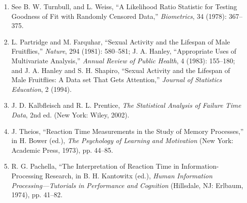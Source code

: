 \documentclass[
]{report}
\begin{document}
\begin{enumerate}
\item See B. W. Turnbull, and L. Weiss, “A Likelihood Ratio Statistic for Testing Goodness of Fit with Randomly Censored Data,” \textit{Biometrics}, 34 (1978): 367–375.
\item L. Partridge and M. Farquhar, “Sexual Activity and the Lifespan of Male Fruitflies,” \textit{Nature}, 294 (1981): 580–581; J. A. Hanley, “Appropriate Uses of Multivariate Analysis,” \textit{Annual Review of Public Health}, 4 (1983): 155–180; and J. A. Hanley and S. H. Shapiro, “Sexual Activity and the Lifespan of Male Fruitflies: A Data set That Gets Attention,” \textit{Journal of Statistics Education}, 2 (1994).
\item J. D. Kalbfleisch and R. L. Prentice, \textit{The Statistical Analysis of Failure Time Data}, 2nd ed. (New York: Wiley, 2002).
\item J. Theios, “Reaction Time Measurements in the Study of Memory Processes,” in H. Bower (ed.), \textit{The Psychology of Learning and Motivation} (New York: Academic Press, 1973), pp. 44–85.
\item R. G. Pachella, “The Interpretation of Reaction Time in Information-Processing Research, in B. H. Kantowitx (ed.), \textit{Human Information Processing—Tutorials in Performance and Cognition} (Hillsdale, NJ: Erlbaum, 1974), pp. 41–82.

\end{enumerate}

  
\end{document}
